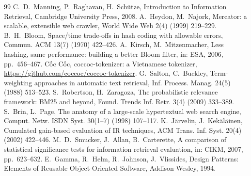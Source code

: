 \documentclass[9pt,twocolumn,a4paper]{extarticle}
\begin{document}
\begin{thebibliography}{99}\footnotesize\itemsep0pt\parskip0pt
 C.~D.~Manning, P.~Raghavan, H.~Sch{\"u}tze, Introduction to Information Retrieval, Cambridge University Press, 2008.
 A.~Heydon, M.~Najork, Mercator: a scalable, extensible web crawler, World Wide Web 2(4) (1999) 219--229.
 B.~H.~Bloom, Space/time trade-offs in hash coding with allowable errors, Commun. ACM 13(7) (1970) 422--426.
 A.~Kirsch, M.~Mitzenmacher, Less hashing, same performance: building a better Bloom filter, in: ESA, 2006, pp.~456--467.
 Cốc Cốc, coccoc-tokenizer: a Vietnamese tokenizer, \url{https://github.com/coccoc/coccoc-tokenizer}.
 G.~Salton, C.~Buckley, Term-weighting approaches in automatic text retrieval, Inf. Process. Manag. 24(5) (1988) 513--523.
 S.~Robertson, H.~Zaragoza, The probabilistic relevance framework: BM25 and beyond, Found. Trends Inf. Retr. 3(4) (2009) 333--389.
 S.~Brin, L.~Page, The anatomy of a large-scale hypertextual web search engine, Comput. Netw. ISDN Syst. 30(1--7) (1998) 107--117.
 K.~J{\"a}rvelin, J.~Kek{\"a}l{\"a}inen, Cumulated gain-based evaluation of IR techniques, ACM Trans. Inf. Syst. 20(4) (2002) 422--446.
 M.~D.~Smucker, J.~Allan, B.~Carterette, A comparison of statistical significance tests for information retrieval evaluation, in: CIKM, 2007, pp.~623--632.
 E.~Gamma, R.~Helm, R.~Johnson, J.~Vlissides, Design Patterns: Elements of Reusable Object-Oriented Software, Addison-Wesley, 1994.
\end{thebibliography}
\end{document}
